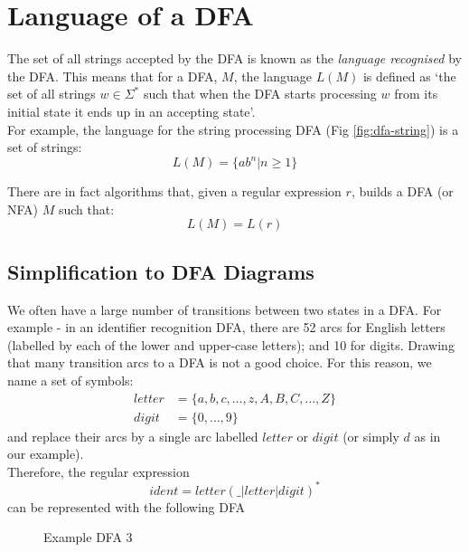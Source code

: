\section{Language of a DFA}
The set of all strings accepted by the DFA is known as the \textit{language recognised} by the DFA. This means that for a DFA, $M$, the language $L(M)$ is defined as `the set of all strings $w \in \Sigma^*$ such that when the DFA starts processing $w$ from its initial state it ends up in an accepting state'. \\

For example, the language for the string processing DFA (Fig \ref{fig:dfa-string}) is a set of strings:
\[L(M) = \{ab^n | n \geq 1\}\]

There are in fact algorithms that, given a regular expression $r$, builds a DFA (or NFA) $M$ such that:
\[L(M) = L(r)\]

\subsection{Simplification to DFA Diagrams}
We often have a large number of transitions between two states in a DFA. For example - in an identifier recognition DFA, there are 52 arcs for English letters (labelled by each of the lower and upper-case letters); and 10 for digits. Drawing that many transition arcs to a DFA is not a good choice. For this reason, we name a set of symbols:
\begin{align*}
    letter &= \{a,b,c,\ldots, z, A, B, C, \ldots, Z\}\\
    digit &= \{0, \ldots, 9\}
\end{align*}
and replace their arcs by a single arc labelled $letter$ or $digit$ (or simply $d$ as in our example).\\

Therefore, the regular expression
\[ident = letter (\_|letter | digit)^*\]
can be represented with the following DFA
\begin{figure}[H]
    \centering
    \caption{Example DFA 3}
\end{figure}



